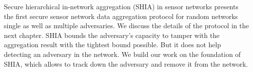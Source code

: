 
	Secure hierarchical in-network aggregation (SHIA) in sensor networks \cite{chan2006secure} presents the first secure sensor network data aggregation protocol for random networks single as well as multiple adversaries. 
	We discuss the details of the protocol in the next chapter. 
	SHIA bounds the adversary's capacity to tamper with the aggregation result with the tightest bound possible.
	But it does not help detecting an adversary in the network.
	We build our work on the foundation of SHIA, which allows to track down the adversary and remove it from the network.